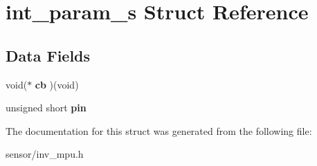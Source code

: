 \hypertarget{structint__param__s}{}\section{int\+\_\+param\+\_\+s Struct Reference}
\label{structint__param__s}
\subsection*{Data Fields}
\begin{DoxyCompactItemize}
\item 
void($\ast$ {\bfseries cb} )(void)
\item 
unsigned short {\bfseries pin}
\end{DoxyCompactItemize}


The documentation for this struct was generated from the following file\+:\begin{DoxyCompactItemize}
\item 
sensor/inv\+\_\+mpu.\+h\end{DoxyCompactItemize}
